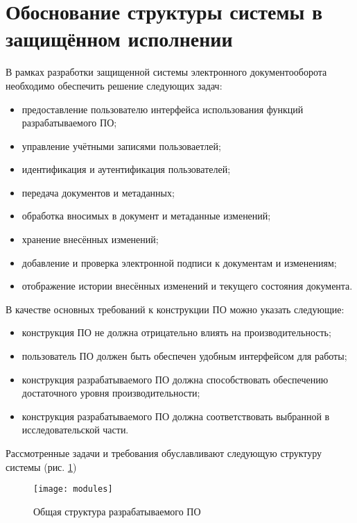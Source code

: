 \section{Обоснование структуры системы в защищённом исполнении} \label{model}

В рамках разработки защищенной системы электронного документооборота необходимо обеспечить решение следующих задач:
\begin{itemize}
	\item предоставление пользователю интерфейса использования функций разрабатываемого ПО;
	\item управление учётными записями пользоваетлей;
	\item идентификация и аутентификация пользователей;
	\item передача документов и метаданных;
	\item обработка вносимых в документ и метаданные изменений;
	\item хранение внесённых изменений;
	\item добавление и проверка электронной подписи к документам и изменениям;
	\item отображение истории внесённых изменений и текущего состояния документа.
\end{itemize}

\vspace{\baselineskip}
В качестве основных требований к конструкции ПО можно указать следующие:
\begin{itemize}
	\item конструкция ПО не должна отрицательно влиять на производительность;
	\item пользователь ПО должен быть обеспечен удобным интерфейсом для работы;
	\item конструкция разрабатываемого ПО должна способствовать обеспечению достаточного уровня производительности;
	\item конструкция разрабатываемого ПО должна соответствовать выбранной в исследовательской части.
\end{itemize}

\vspace{\baselineskip}
Рассмотренные задачи и требования обуславливают следующую структуру системы (рис. \ref{img:modules})
\begin{figure}[h!]
  \centering
  \texttt{[image: modules]}
  \caption{Общая структура разрабатываемого ПО}
  \label{img:modules}
\end{figure}

